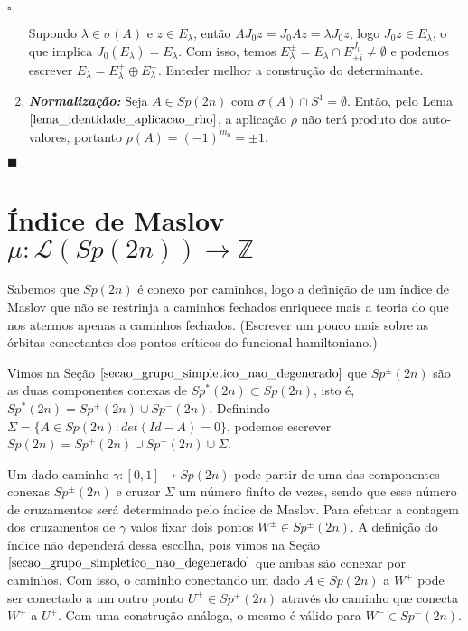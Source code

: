 \documentclass[12pt]{book}
\newenvironment{prova}[1]{$\square$ #1}{\hfill$\blacksquare$}
\newcommand{\caminhos}{\mathcal{L}}
\newcommand{\caminhossempontobase}[1]{\caminhos(#1)}
\newcommand{\circulo}{S^{1}}
\newcommand{\estruturacomplexa}{J_{0}}
\newcommand{\gruposimpletico}[1]{Sp(#1)}
\newcommand{\gruposimpleticonaodegenerado}[1]{Sp^{#1}(2n)}
\newcommand{\inteiros}{\mathbb{Z}}
\newcommand{\vermelho}[1]{{\color{red}#1}}
\begin{document}
\begin{prova}
\begin{enumerate}
			Supondo $\lambda \in \sigma(A)$ e $z \in E_{\lambda}$, então $ A\estruturacomplexa z = \estruturacomplexa A z= \lambda \estruturacomplexa z$, logo $\estruturacomplexa z \in E_{\lambda}$, o que implica $\estruturacomplexa(E_{\lambda}) = E_{\lambda}$. Com isso, temos $E_{\lambda}^{\pm} =E_{\lambda}\cap E^{\estruturacomplexa}_{\pm i}  \neq \emptyset$ e podemos escrever $E_{\lambda} = E_{\lambda}^{+}\oplus E_{\lambda}^{-}$. \vermelho{Enteder melhor a construção do determinante.}
			
			\item \textbf{\textit{Normalização:}} Seja $A\in \gruposimpletico{2n}$ com $\sigma(A)\cap \circulo = \emptyset$. Então, pelo Lema $\ref{lema_identidade_aplicacao_rho}$, a aplicação $\rho$ não terá produto dos auto-valores, portanto $\rho(A) = (-1)^{m_{0}} = \pm 1$. 
		\end{enumerate}
	\end{prova}
	
	\section{Índice de Maslov $\mu : \caminhossempontobase{\gruposimpletico{2n}} \to \inteiros$}
	
	Sabemos que $\gruposimpletico{2n}$ é conexo por caminhos, logo a definição de um índice de Maslov que não se restrinja a caminhos fechados enriquece mais a teoria do que nos atermos apenas a caminhos fechados. \vermelho{(Escrever um pouco mais sobre as órbitas conectantes dos pontos críticos do funcional hamiltoniano.)}
	
	Vimos na Seção $\ref{secao_grupo_simpletico_nao_degenerado}$ que $\gruposimpleticonaodegenerado{\pm}$ são as duas componentes conexas de  $\gruposimpleticonaodegenerado{*}\subset \gruposimpletico{2n}$, isto é, $\gruposimpleticonaodegenerado{*}=\gruposimpleticonaodegenerado{+}\cup\gruposimpleticonaodegenerado{-}$. Definindo $\Sigma = \{A \in \gruposimpletico{2n}: det(Id-A)=0 \}$, podemos escrever $\gruposimpletico{2n}=\gruposimpleticonaodegenerado{+}\cup\gruposimpleticonaodegenerado{-}\cup \Sigma$.
	
	Um dado caminho $\gamma:[0,1]\to \gruposimpletico{2n}$ pode partir de uma das componentes conexas $\gruposimpleticonaodegenerado{\pm}$ e cruzar $\Sigma$ um número finíto de vezes, sendo que esse número de cruzamentos será determinado pelo índice de Maslov. Para efetuar a contagem dos cruzamentos de $\gamma$ valos fixar dois pontos $W^{\pm} \in \gruposimpleticonaodegenerado{\pm}$. A definição do índice não dependerá dessa escolha, pois vimos na Seção $\ref{secao_grupo_simpletico_nao_degenerado}$ que ambas são conexar por caminhos. Com isso, o caminho conectando um dado $A \in \gruposimpletico{2n}$ a $W^{+}$ pode ser conectado a um outro ponto $U^{+} \in \gruposimpleticonaodegenerado{+}$ através do caminho que conecta $W^{+}$ a $U^{+}$. Com uma construção análoga, o mesmo é válido para $W^{-} \in \gruposimpleticonaodegenerado{-}$. 
	
\end{document}
